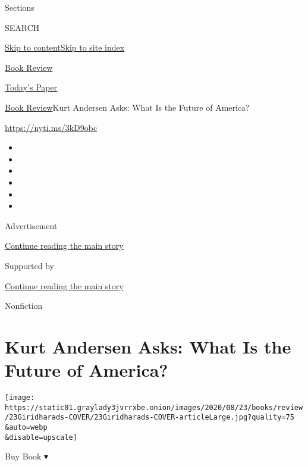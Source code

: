 Sections

SEARCH

\protect\hyperlink{site-content}{Skip to
content}\protect\hyperlink{site-index}{Skip to site index}

\href{https://www.nytimes3xbfgragh.onion/section/books/review}{Book
Review}

\href{https://myaccount.nytimes3xbfgragh.onion/auth/login?response_type=cookie\&client_id=vi}{}

\href{https://www.nytimes3xbfgragh.onion/section/todayspaper}{Today's
Paper}

\href{/section/books/review}{Book Review}\textbar{}Kurt Andersen Asks:
What Is the Future of America?

\url{https://nyti.ms/3kD9obc}

\begin{itemize}
\item
\item
\item
\item
\item
\item
\end{itemize}

Advertisement

\protect\hyperlink{after-top}{Continue reading the main story}

Supported by

\protect\hyperlink{after-sponsor}{Continue reading the main story}

Nonfiction

\hypertarget{kurt-andersen-asks-what-is-the-future-of-america}{%
\section{Kurt Andersen Asks: What Is the Future of
America?}\label{kurt-andersen-asks-what-is-the-future-of-america}}

\texttt{[image: https://static01.graylady3jvrrxbe.onion/images/2020/08/23/books/review/23Giridharads-COVER/23Giridharads-COVER-articleLarge.jpg?quality=75\\\&auto=webp\\\&disable=upscale]}

Buy Book ▾

